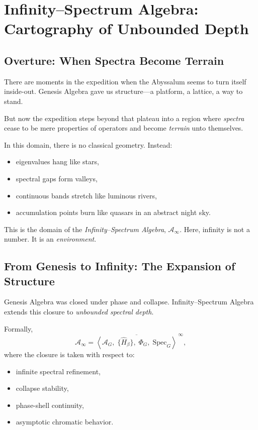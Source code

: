 
\chapter{Infinity--Spectrum Algebra: Cartography of Unbounded Depth}
\label{ch:infinity-spectrum}

\section*{Overture: When Spectra Become Terrain}
There are moments in the expedition when the Abyssalum seems to turn itself inside-out.
Genesis Algebra gave us structure---a platform, a lattice, a way to stand.

But now the expedition steps beyond that plateau into a region where \emph{spectra} cease to be mere
properties of operators and become \emph{terrain} unto themselves.

In this domain, there is no classical geometry. Instead:
\begin{itemize}
  \item eigenvalues hang like stars,
  \item spectral gaps form valleys,
  \item continuous bands stretch like luminous rivers,
  \item accumulation points burn like quasars in an abstract night sky.
\end{itemize}

This is the domain of the \emph{Infinity--Spectrum Algebra}, $\mathcal{A}_\infty$.
Here, infinity is not a number. It is an \emph{environment}.

\section{From Genesis to Infinity: The Expansion of Structure}
Genesis Algebra was closed under phase and collapse. Infinity--Spectrum Algebra extends this closure
to \emph{unbounded spectral depth}.

Formally,
\[
\mathcal{A}_\infty
=
\overline{
\left\langle
\mathcal{A}_G,\;
\{\hat{H}_\beta\},\;
\Phi_G,\;
\mathrm{Spec}_G
\right\rangle
}^{\,\infty},
\]
where the closure is taken with respect to:
\begin{itemize}
  \item infinite spectral refinement,
  \item collapse stability,
  \item phase-shell continuity,
  \item asymptotic chromatic behavior.
\end{itemize}

